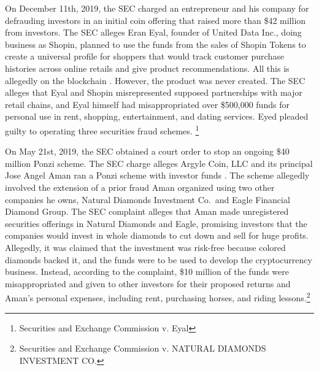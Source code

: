 On December 11th, 2019, the SEC charged an entrepreneur and his company for
defrauding investors in an initial coin offering that raised more than \$42
million from investors. The SEC alleges Eran Eyal, founder of United Data Inc.,
doing business as Shopin, planned to use the funds from the sales of Shopin
Tokens to create a universal profile for shoppers that would track customer
purchase histories across online retails and give product recommendations. All
this is allegedly on the blockchain \cite{noauthor_securities_2020}. However,
the product was never created. The SEC alleges that Eyal and Shopin
misrepresented supposed partnerships with major retail chains, and Eyal himself
had misappropriated over \$500,000 funds for personal use in rent, shopping,
entertainment, and dating services. Eyed pleaded guilty to operating three
securities fraud schemes. \footnote{Securities and Exchange Commission v. Eyal}

On May 21st, 2019, the SEC obtained a court order to stop an ongoing \$40
million Ponzi scheme. The SEC charge alleges Argyle Coin, LLC and its principal
Jose Angel Aman ran a Ponzi scheme with investor funds
\cite{noauthor_securities_2020-3}. The scheme allegedly involved the extension
of a prior fraud Aman organized using two other companies he owns, Natural
Diamonds Investment Co. and Eagle Financial Diamond Group. The SEC complaint
alleges that Aman made unregistered securities offerings in Natural Diamonds and
Eagle, promising investors that the companies would invest in whole diamonds to
cut down and sell for huge profits. Allegedly, it was claimed that the
investment was risk-free because colored diamonds backed it, and the funds were
to be used to develop the cryptocurrency business.  Instead, according to the
complaint, \$10 million of the funds were misappropriated and given to other
investors for their proposed returns and Aman's personal expenses, including
rent, purchasing horses, and riding lessons.\footnote{Securities and Exchange
Commission v. NATURAL DIAMONDS INVESTMENT CO.}

